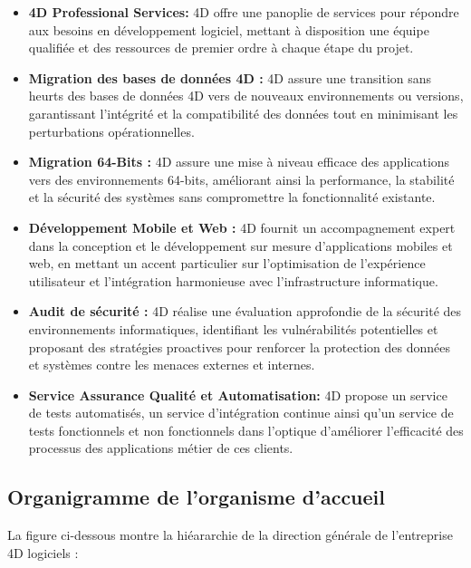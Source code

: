 \begin{itemize}
    \item  \textbf{4D Professional Services: } 4D offre une panoplie de services pour répondre aux besoins en développement logiciel, mettant à disposition une équipe qualifiée et des ressources de premier ordre à chaque étape du projet.\\
    \item \textbf{Migration des bases de données 4D :} 4D assure une transition sans heurts des bases de données 4D vers de nouveaux environnements ou versions, garantissant l’intégrité et la compatibilité des données tout en minimisant les perturbations opérationnelles.\\
    \item \textbf{ Migration 64-Bits : } 4D assure une mise à niveau efficace des applications vers des environnements 64-bits, améliorant ainsi la performance, la stabilité et la sécurité des systèmes sans compromettre la fonctionnalité existante.\\
    \item \textbf{ Développement Mobile et Web :}  4D fournit un accompagnement expert dans la conception et le développement sur mesure d’applications mobiles et web, en mettant un accent particulier sur l’optimisation de l’expérience utilisateur et l’intégration harmonieuse avec l’infrastructure informatique.\\
    \item \textbf{Audit de sécurité :}  4D réalise une évaluation approfondie de la sécurité des environnements informatiques, identifiant les vulnérabilités potentielles et proposant des stratégies proactives pour renforcer la protection des données et systèmes contre les menaces externes et internes.\\
    \item \textbf{Service Assurance Qualité et Automatisation:}  4D propose un service de tests automatisés, un service d’intégration continue ainsi qu’un service de tests fonctionnels et non fonctionnels dans l’optique d’améliorer l’efficacité des processus des applications métier de ces clients.\\
        

\end{itemize}


\subsection{Organigramme de l’organisme d’accueil}
La figure ci-dessous montre la hiéararchie de la direction générale de l’entreprise 4D
logiciels :

